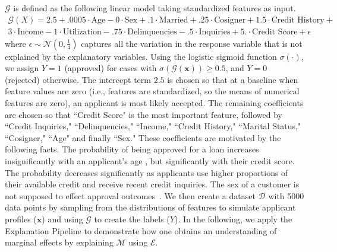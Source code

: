 \documentclass[mnsc,blindrev]{informs3}
\begin{document}
    $\mathcal{G}$ is defined as the following linear model taking standardized features as input. 
    \begin{equation}
    \label{eqn:gt}
    \begin{split}
    \mathcal{G}(X) =2.5 +.0005\cdot\text{Age} -0\cdot\text{Sex} +.1 \cdot \text{Married} + .25\cdot \text{Cosigner} + 1.5 \cdot \text{Credit History} + \\   3 \cdot \text{Income} - 1\cdot\text{Utilization} -.75 \cdot \text{Delinquencies} - .5\cdot\text{Inquiries} + 5.\cdot\text{Credit Score} + \epsilon
    \end{split}
    \end{equation}
    \noindent where $\epsilon \sim \mathcal{N}(0,\frac{1}{4})$ captures all the variation in the response variable that is not explained by the explanatory variables.
    Using the logistic sigmoid function $\sigma(\cdot)$, we assign $Y = 1$ (approved) for cases with $\sigma(\mathcal{G}(\mathbf{x}))\geq 0.5$, and $Y = 0$ (rejected) otherwise. The intercept term $2.5$ is chosen so that at a baseline when feature values are zero (i.e., features are standardized, so the means of numerical features are zero), an applicant is most likely accepted. The remaining coefficients are chosen so that ``Credit Score" is the most important feature, followed by ``Credit Inquiries," ``Delinquencies," ``Income," ``Credit History," ``Marital Status," ``Cosigner," ``Age" and finally ``Sex." These coefficients are motivated by the following facts. The probability of being approved for a loan increases insignificantly with an applicant's age \citep{cfb_age}, but significantly with their credit score. The probability decreases significantly as applicants use higher proportions of their available credit and receive recent credit inquiries. The sex of a customer is not supposed to effect approval outcomes~\citep{Calcagnini2014}. 
   We then create a dataset $\mathcal{D}$ with 5000 data points by sampling from the distributions of features to simulate applicant profiles ($\mathbf{x}$) and using $\mathcal{G}$ to create the labels ($Y$).  
   In the following, we apply the Explanation Pipeline to demonstrate how one obtains an understanding of marginal effects by explaining $\mathcal{M}$ using $\mathcal{E}$. 
\end{document}
